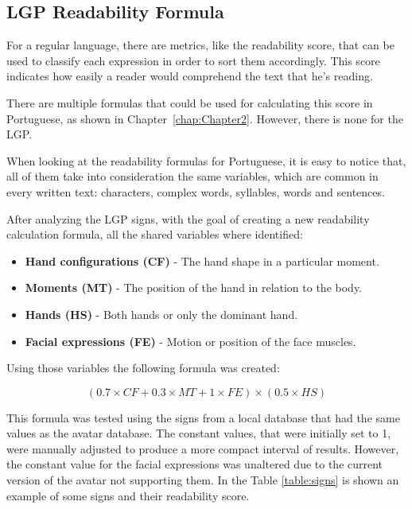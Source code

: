 \subsection{LGP Readability Formula}

For a regular language, there are metrics, like the readability score, that can be used to classify each expression in order to sort them accordingly.
This score indicates how easily a reader would comprehend the text that he's reading.

There are multiple formulas that could be used for calculating this score in Portuguese, as shown in Chapter~\ref{chap:Chapter2}.
However, there is none for the \gls{LGP}.

When looking at the readability formulas for Portuguese, it is easy to notice that, all of them take into consideration the same variables, which are common in every written text: characters, complex words, syllables, words and sentences.

After analyzing the \gls{LGP} signs, with the goal of creating a new readability calculation formula, all the shared variables where identified:

\begin{itemize}
    \item \textbf{Hand configurations (CF)} - The hand shape in a particular moment.
    \item \textbf{Moments (MT)} - The position of the hand in relation to the body.
    \item \textbf{Hands (HS)} - Both hands or only the dominant hand.
    \item \textbf{Facial expressions (FE)} - Motion or position of the face muscles.
\end{itemize}

Using those variables the following formula was created:

\begin{equation}
(0.7 \times CF + 0.3 \times MT + 1 \times FE) \times (0.5 \times HS)
\label{wordScore}
\end{equation}

This formula was tested using the signs from a local database that had the same values as the avatar database.
The constant values, that were initially set to 1, were manually adjusted to produce a more compact interval of results.
However, the constant value for the facial expressions was unaltered due to the current version of the avatar not supporting them.
In the Table \ref{table:signs} is shown an example of some signs and their readability score.

